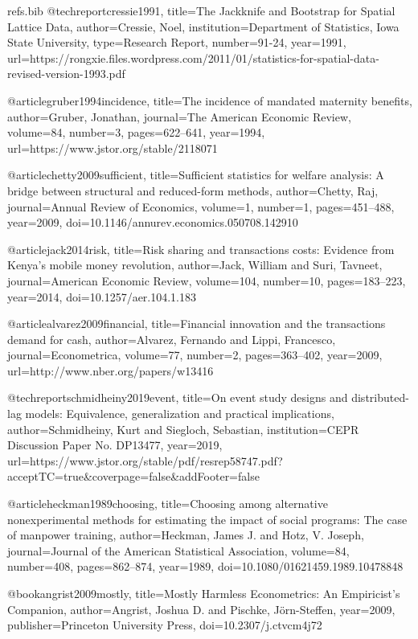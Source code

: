 \begin{filecontents}[overwrite]{refs.bib}
@techreport{cressie1991,
  title={The Jackknife and Bootstrap for Spatial Lattice Data},
  author={Cressie, Noel},
  institution={Department of Statistics, Iowa State University},
  type={Research Report},
  number={91-24},
  year={1991},
  url={https://rongxie.files.wordpress.com/2011/01/statistics-for-spatial-data-revised-version-1993.pdf}
}

@article{gruber1994incidence,
  title={The incidence of mandated maternity benefits},
  author={Gruber, Jonathan},
  journal={The American Economic Review},
  volume={84},
  number={3},
  pages={622--641},
  year={1994},
  url={https://www.jstor.org/stable/2118071}
}

@article{chetty2009sufficient,
  title={Sufficient statistics for welfare analysis: A bridge between structural and reduced-form methods},
  author={Chetty, Raj},
  journal={Annual Review of Economics},
  volume={1},
  number={1},
  pages={451--488},
  year={2009},
  doi={10.1146/annurev.economics.050708.142910}
}

@article{jack2014risk,
  title={Risk sharing and transactions costs: Evidence from Kenya's mobile money revolution},
  author={Jack, William and Suri, Tavneet},
  journal={American Economic Review},
  volume={104},
  number={10},
  pages={183--223},
  year={2014},
  doi={10.1257/aer.104.1.183}
}

@article{alvarez2009financial,
  title={Financial innovation and the transactions demand for cash},
  author={Alvarez, Fernando and Lippi, Francesco},
  journal={Econometrica},
  volume={77},
  number={2},
  pages={363--402},
  year={2009},
  url={http://www.nber.org/papers/w13416}
}

@techreport{schmidheiny2019event,
  title={On event study designs and distributed-lag models: Equivalence, generalization and practical implications},
  author={Schmidheiny, Kurt and Siegloch, Sebastian},
  institution={CEPR Discussion Paper No. DP13477},
  year={2019},
  url={https://www.jstor.org/stable/pdf/resrep58747.pdf?acceptTC=true&coverpage=false&addFooter=false}
}

@article{heckman1989choosing,
  title={Choosing among alternative nonexperimental methods for estimating the impact of social programs: The case of manpower training},
  author={Heckman, James J. and Hotz, V. Joseph},
  journal={Journal of the American Statistical Association},
  volume={84},
  number={408},
  pages={862--874},
  year={1989},
  doi={10.1080/01621459.1989.10478848}
}

@book{angrist2009mostly,
  title={Mostly Harmless Econometrics: An Empiricist's Companion},
  author={Angrist, Joshua D. and Pischke, J{\"o}rn-Steffen},
  year={2009},
  publisher={Princeton University Press},
  doi={10.2307/j.ctvcm4j72}
}


\end{filecontents}
